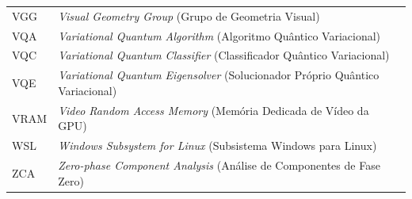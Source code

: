 \documentclass[
    12pt,
    openright,
    oneside,
    a4paper,
    english,
    brazil
]{abntex2}
\begin{document}
\begin{longtable}{@{}p{3.9cm}p{\dimexpr\textwidth-3.9cm-2\tabcolsep\relax}@{}}
VGG & \textit{Visual Geometry Group} (Grupo de Geometria Visual) \\
VQA & \textit{Variational Quantum Algorithm} (Algoritmo Quântico Variacional) \\
VQC & \textit{Variational Quantum Classifier} (Classificador Quântico Variacional) \\
VQE & \textit{Variational Quantum Eigensolver} (Solucionador Próprio Quântico Variacional) \\
VRAM & \textit{Video Random Access Memory} (Memória Dedicada de Vídeo da GPU) \\
WSL & \textit{Windows Subsystem for Linux} (Subsistema Windows para Linux) \\
ZCA & \textit{Zero-phase Component Analysis} (Análise de Componentes de Fase Zero) \\
\end{longtable}
\addtocounter{table}{-1}
\cleardoublepage

\end{document}
